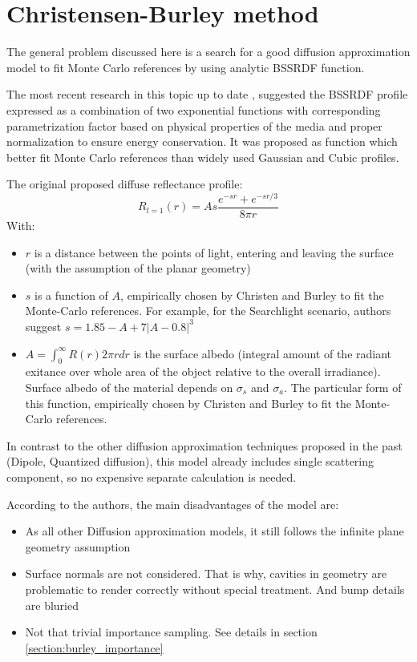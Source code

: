 \section{Christensen-Burley method}
The general problem discussed here is a search for a good diffusion
approximation model to fit Monte Carlo references by using analytic BSSRDF function.

The most recent research in this topic up to date
\cite{Christensen:2015:ARP:2775280.2792555}, \cite{Burley:disney_siggraph15}
suggested the \gls{BSSRDF} profile expressed as a combination of two exponential
functions with corresponding parametrization factor based on physical properties
of the media and proper normalization to ensure energy conservation. It was
proposed as function which better fit Monte Carlo references than widely used
Gaussian and Cubic profiles.

The original proposed diffuse reflectance profile:
\begin{equation}\label{eq:burley}
R_{l=1}(r) = As\dfrac{e^{-sr}+e^{-sr/3}}{8\pi r}
\end{equation}
With:
\begin{itemize}
    \item{$r$ is a distance between the points of light, entering and leaving
    the surface (with the assumption of the planar geometry)}
    \item{$s$ is a function of $A$, empirically chosen by Christen and Burley
    to fit the Monte-Carlo references. For example, for the Searchlight
    scenario, authors suggest $s = 1.85 - A + 7|A-0.8|^3$}
    \item{ $A=\int_0^{\infty} R(r)2\pi rdr$ is the surface albedo (integral
    amount of the radiant exitance over whole area of the object relative to the
    overall irradiance). Surface albedo of the material depends on $\sigma_s$
    and $\sigma_a$. The particular form of this function, empirically chosen by
    Christen and Burley to fit the Monte-Carlo references.}
\end{itemize}

In contrast to the other diffusion approximation techniques proposed in the past
(Dipole, Quantized diffusion), this model already includes single scattering
component, so no expensive separate calculation is needed.


According to the authors, the main disadvantages of the model are:
\begin{itemize}
  \item {As all other Diffusion approximation models, it still follows the
  infinite plane geometry assumption
  }
  \item {Surface normals are not considered. That is why, cavities in
  geometry are problematic to render correctly without special treatment. And
  bump details are bluried}
  \item{Not that trivial importance sampling. See details in section
  \ref{section:burley_importance}}
\end{itemize}